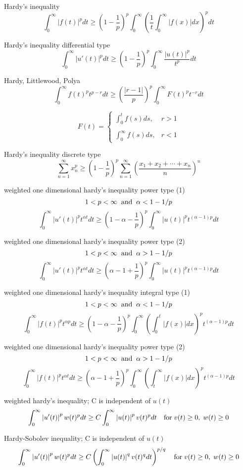 Hardy's inequality
$$
\int^\infty_0|f(t)|^p dt \ge\left(1-\frac{1}{p}\right)^p\int^\infty_0\left(\frac{1}{t}\int^\infty_0|f(x)|dx\right)^p dt
$$

Hardy's inequality differential type
$$
\int^\infty_0|u'(t)|^p dt \ge \left(1-\frac{1}{p}\right)^p\int^\infty_0\frac{|u(t)|^p}{t^p}dt
$$

Hardy, Littlewood, Polya
$$
\int^\infty_0f(t)^pt^{p-r} dt\ge \left(\frac{|r-1|}{p}\right)^p\int^\infty_0F(t)^pt^{-r}dt
$$

$$
F(t)=
\left\{
\begin{array}{ll}
\int^t_0 f(s)ds, & r>1 \\
\\
\int^\infty_0 f(s)ds, & r<1
\end{array}
\right.
$$

Hardy's inequality discrete type
$$
\sum^\infty_{n=1} x^p_n \ge \left(1-\frac{1}{p}\right)^p\sum^\infty_{n=1}\left(\frac{x_1+x_2+\cdots+x_n}{n}\right)^n
$$

weighted one dimensional hardy's inequality power type (1)
$$
1< p <\infty \;\; {\rm and} \;\; \alpha< 1-1/p
$$
$$
\int^\infty_0\left |u'(t)\right|^p t^{\alpha t}dt \ge \left(1-\alpha-\frac{1}{p}\right)^p\int^\infty_0 \left |u(t)\right|^p t^{(\alpha-1)p}dt
$$

weighted one dimensional hardy's inequality power type (2)
$$
1< p <\infty \;\; {\rm and} \;\; \alpha> 1-1/p
$$
$$
\int^\infty_0\left |u'(t)\right|^p t^{\alpha t}dt \ge \left(\alpha-1+\frac{1}{p}\right)^p\int^\infty_0 \left |u(t)\right|^p t^{(\alpha-1)p}dt
$$

weighted one dimensional hardy's inequality integral type (1)
$$
1< p <\infty \;\; {\rm and} \;\; \alpha< 1-1/p
$$
$$
\int^\infty_0\left |f(t)\right|^p t^{\alpha p}dt \ge \left(1-\alpha-\frac{1}{p}\right)^p\int^\infty_0\left(\int_0^t \left |f(x)\right|dx\right)^p t^{(\alpha-1)p}dt
$$

weighted one dimensional hardy's inequality power type (2)
$$
1< p <\infty \;\; {\rm and} \;\; \alpha> 1-1/p
$$
$$
\int^\infty_0\left |f(t)\right|^p t^{\alpha t}dt \ge \left(\alpha-1+\frac{1}{p}\right)^p\int^\infty_0\left(\int^\infty_t\left|f(x)\right|dx\right)^p t^{(\alpha-1)p}dt
$$

weighted hardy's inequality; C is independent of $u(t)$
$$
\int^\infty_0\left|u'(t)\right|^p w(t)^pdt \ge C \int^\infty_0\left|u(t)\right|^p v(t)^p dt \quad {\rm for} \; v(t)\ge 0,\;w(t)\ge 0
$$

Hardy-Sobolev inequality; C is independent of $u(t)$
$$
\int^\infty_0\left|u'(t)\right|^p w(t)^pdt \ge C \left(\int^\infty_0\left|u(t)\right|^q v(t)^q dt \right)^{p/q} \quad {\rm for} \; v(t)\ge 0,\;w(t)\ge 0
$$